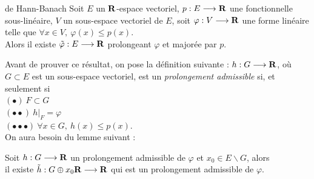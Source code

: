\documentclass[a4paper,11pt, twoside]{article}
\begin{document}
\begin{thC}{de Hann-Banach}
  Soit $E$ un $\mathbf R$-espace vectoriel, $p:E\longrightarrow \mathbf R$ une fonctionnelle sous-linéaire, $V$ un sous-espace vectoriel de $E$, soit $\varphi:V\longrightarrow\mathbf R$ une forme linéaire telle que $\forall x\in V,\ \varphi(x)\leqslant p(x).$\\

  Alors il existe $\tilde\varphi:E\longrightarrow\mathbf R$ prolongeant $\varphi$ et majorée par $p$.
\end{thC}


Avant de prouver ce résultat, on pose la définition suivante : $h:G\longrightarrow\mathbf R$, où $G\subset E$ est un sous-espace vectoriel, est un \emph{prolongement admissible} si, et seulement si\\
$(\bullet)\ F\subset G$\\
$(\bullet\bullet)\ h\big|_F=\varphi$\\
$(\bullet\bullet\bullet)\ \forall x\in G,\ h(x)\leqslant p(x).$\\


On aura besoin du lemme suivant : 


\begin{lemme}
  Soit $h:G\longrightarrow\mathbf R$ un prolongement admissible de $\varphi$ et $x_0\in E\backslash G$, alors\\

  il existe $\tilde h:G\oplus x_0\mathbf R\longrightarrow\mathbf R$ qui est un prolongement admissible de $\varphi$.
\end{lemme}
\end{document}
